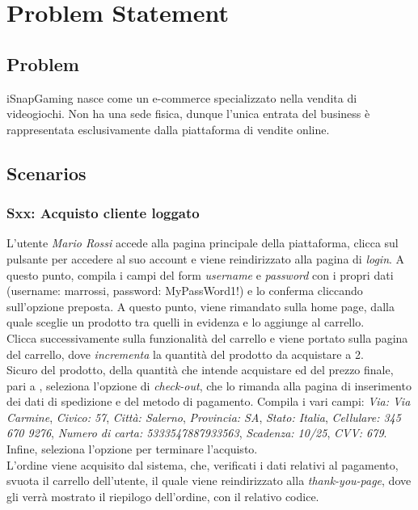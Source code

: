 \documentclass[12pt, a4paper, oneside]{book}
\begin{document}
    \setcounter{tocdepth}{3} %

    \tableofcontents

    \chapter*{Problem Statement}
    \section*{Problem}
    iSnapGaming nasce come un e-commerce specializzato nella vendita di videogiochi. Non ha una sede fisica, dunque l'unica entrata del business è rappresentata esclusivamente dalla piattaforma di vendite online.

    \section*{Scenarios}
    \subsection*{Sxx: Acquisto cliente loggato}
    L'utente \textit{Mario Rossi} accede alla pagina principale della piattaforma, clicca sul pulsante per accedere al suo account e viene reindirizzato alla pagina di \textit{login}. A questo punto, compila i campi del form \textit{username} e \textit{password} con i propri dati (username: marrossi, password: MyPassWord1!) e lo conferma cliccando sull'opzione preposta. A questo punto, viene rimandato sulla home page, dalla quale sceglie un prodotto tra quelli in evidenza e lo aggiunge al carrello.\\
    Clicca successivamente sulla funzionalità del carrello e viene portato sulla pagina del carrello, dove \textit{incrementa} la quantità del prodotto da acquistare a 2.\\
    Sicuro del prodotto, della quantità che intende acquistare ed del prezzo finale, pari a , seleziona l'opzione di \textit{check-out}, che lo rimanda alla pagina di inserimento dei dati di spedizione e del metodo di pagamento. Compila i vari campi: \textit{Via: Via Carmine}, \textit{Civico: 57}, \textit{Città: Salerno}, \textit{Provincia: SA}, \textit{Stato: Italia}, \textit{Cellulare: 345 670 9276}, \textit{Numero di carta: 5333547887933563}, \textit{Scadenza: 10/25}, \textit{CVV: 679}. Infine, seleziona l'opzione per terminare l'acquisto.\\
    L'ordine viene acquisito dal sistema, che, verificati i dati relativi al pagamento, svuota il carrello dell'utente, il quale viene reindirizzato alla \textit{thank-you-page}, dove gli verrà mostrato il riepilogo dell'ordine, con il relativo codice.
\end{document}
